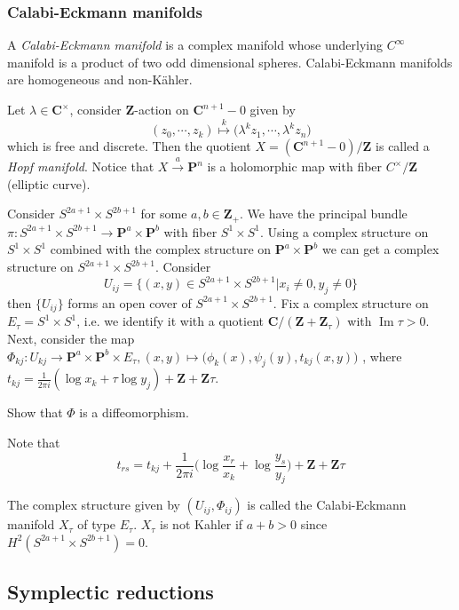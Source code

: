 \documentclass[
11pt, %
letterpaper， %
oneside, %
headinclude,footinclude, %
BCOR5mm, %
]{scrartcl}
\newcommand{\Z}{{\mathbf{Z}}}
\newcommand{\C}{{\mathbf{C}}}
\newcommand{\cp}{{\mathbf{P}}}
\newcommand{\im}{\operatorname{Im}}
\newcommand{\its}{\textit}
\begin{document}
\subsubsection{Calabi-Eckmann manifolds}
A \its{Calabi-Eckmann manifold} is a complex manifold whose underlying $C^{\infty}$ manifold is a product of two odd dimensional spheres. Calabi-Eckmann manifolds are homogeneous and non-Kähler.
\begin{ex}
	Let $\lambda \in \C^{\times}$, consider $\Z$-action on $\C^{n+1}-0$ given by
	\begin{equation*}
	(z_0, \cdots, z_k)\stackrel{k}{\mapsto} \big( \lambda^kz_1, \cdots,  \lambda^k z_n\big)	\end{equation*}
	which is free and discrete. Then the quotient $X=(\C^{n+1}-0)/\Z$ is called a \its{Hopf manifold}. Notice that $X\stackrel{a}{\to } \cp^n$ is a holomorphic map with fiber $C^{\times}/\Z$(elliptic curve).
\end{ex}
Consider $S^{2a+1}\times S^{2b+1}$ for some $a,b\in \Z_+$. We have the principal bundle $\pi: S^{2a+1}\times S^{2b+1} \to \cp^a\times \cp^b$ with fiber $S^1\times S^1$. Using a complex structure on $S^1\times S^1$ combined with the complex structure on $\cp^a\times \cp^b$ we can get a complex structure on $S^{2a+1}\times S^{2b+1}$. Consider \begin{equation*}
U_{ij}=\{(x,y)\in S^{2a+1}\times S^{2b+1}| x_i\not=0, y_j\not=0  \}
\end{equation*}
then $\{ U_{ij}\}$ forms an open cover of  $S^{2a+1}\times S^{2b+1}$. Fix a complex structure on $E_{\tau}=S^1\times S^1$, i.e. we identify it with a  quotient $\C/(\Z+\Z_{\tau})$ with $\im \tau >0$. Next, consider the map $\Phi_{kj}: U_{kj}\to \cp^a\times \cp^b\times E_{\tau}, (x,y)\mapsto \big(\phi_k(x), \psi_j(y), t_{kj}(x,y) \big)$ , where $t_{kj}=\frac{1}{2\pi i}(\log x_k+ \tau \log y_j )+ \Z+ \Z \tau$.
\begin{exercise}
	Show that $\Phi$ is a diffeomorphism.
\end{exercise}
Note that
\begin{equation*}
t_{rs}= t_{kj}+\frac{1}{2\pi i}\bigg(\log \frac{x_r}{x_k}+\log \frac{y_s}{y_j} \bigg)+ \Z +\Z\tau
\end{equation*}

The complex structure given by $(U_{ij}, \Phi_{ij})$ is called the Calabi-Eckmann manifold $X_{\tau}$ of type $E_{\tau}$. $X_{\tau}$ is not Kahler if $a+b>0$ since $H^2(S^{2a+1}\times S^{2b+1})=0$.
\subsection{Symplectic reductions}
\end{document}
